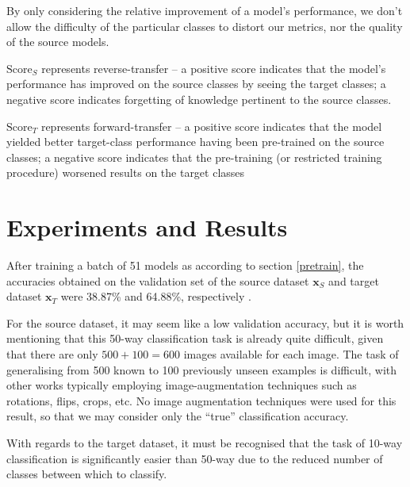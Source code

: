 \documentclass{report}
\begin{document}
	By only considering the relative improvement of a model's performance, we don't allow the difficulty of the particular classes to distort our metrics, nor the quality of the source models. \par
	$\text{Score}_S$ represents reverse-transfer -- a positive score indicates that the model's performance has improved on the source classes by seeing the target classes; a negative score indicates forgetting of knowledge pertinent to the source classes. \par
	$\text{Score}_T$ represents forward-transfer -- a positive score indicates that the model yielded better target-class performance having been pre-trained on the source classes; a negative score indicates that the pre-training (or restricted training procedure) worsened results on the target classes \par
	
	\section{Experiments and Results}
	After training a batch of 51 models as according to section \ref{pretrain}, the accuracies obtained on the validation set of the source dataset $\bm{x}_S$ and target dataset $\bm{x}_T$ were 38.87\% and 64.88\%, respectively .\par
	For the source dataset, it may seem like a low validation accuracy, but it is worth mentioning that this 50-way classification task is already quite difficult, given that there are only $500+100=600$ images available for each image. The task of generalising from 500 known to 100 previously unseen examples is difficult, with other works typically employing image-augmentation techniques such as rotations, flips, crops, etc. No image augmentation techniques were used for this result, so that we may consider only the ``true'' classification accuracy. \par
	With regards to the target dataset, it must be recognised that the task of 10-way classification is significantly easier than 50-way due to the reduced number of classes between which to classify. \par
	
\end{document}
